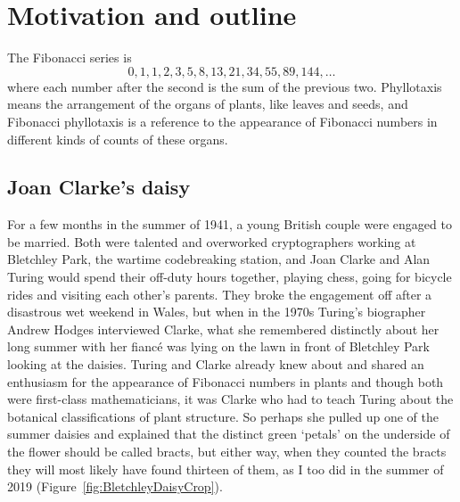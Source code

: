 

\chapter{Motivation and outline}
The Fibonacci series is
\[
0, 1, 1, 2, 3, 5,8, 13, 21, 34, 55, 89, 144, \dots
\] where each number after the second is the sum of the previous two. Phyllotaxis means the arrangement of the organs of plants, like leaves and seeds,  and Fibonacci phyllotaxis is a reference to the appearance of Fibonacci numbers in different kinds of counts of these organs. 
 
\section{Joan Clarke's daisy}

%
 For a few months in the summer of 1941, a young British couple were engaged to be married. Both were talented and overworked cryptographers working at Bletchley Park, the wartime codebreaking station, and  
 Joan Clarke and Alan Turing would spend their off-duty hours together, playing chess,  going for bicycle rides and visiting each other's parents. They broke the engagement off after a disastrous wet weekend in Wales, but when in the 1970s Turing's biographer Andrew Hodges interviewed Clarke, what she remembered distinctly about her long summer with her fianc\'e was lying on the lawn in front of Bletchley Park looking at the daisies. Turing and Clarke already knew about and shared an enthusiasm for the appearance of Fibonacci numbers in plants and though both were first-class mathematicians, it was Clarke who had to teach Turing about the botanical classifications of plant structure. So perhaps she  pulled up one of the summer daisies and explained that the distinct green `petals' on the underside of the flower should be called bracts, but either way, when they counted the bracts they will  most likely have found thirteen of them, as I too did in the summer of 2019 (Figure~\ref{fig:BletchleyDaisyCrop}).

